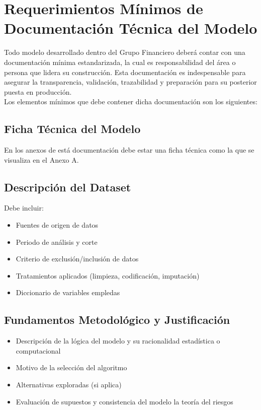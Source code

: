 \documentclass[11pt,oneside]{article}%
\begin{document}
\section{Requerimientos Mínimos de Documentación Técnica del Modelo}

Todo modelo desarrollado dentro del Grupo Financiero deberá contar con una documentación mínima estandarizada, la cual es responsabilidad del área o persona que lidera su construcción. Esta documentación es indespensable para asegurar la transparencia, validación, trazabilidad y preparación para su posterior puesta en producción. \\

Los elementos mínimos que debe contener dicha documentación son los siguientes: 

\subsection{Ficha Técnica del Modelo}

En los anexos de está documentación debe estar una ficha técnica como la que se visualiza en el Anexo A. 

\subsection{Descripción del Dataset}

Debe incluir: 
\begin{itemize}
\item Fuentes de origen de datos
\item Periodo de análisis y corte
\item Criterio de exclusión/inclusión de datos 
\item Tratamientos aplicados (limpieza, codificación, imputación)
\item Diccionario de variables empledas 
\end{itemize}

\subsection{Fundamentos Metodológico y Justificación} 
\begin{itemize}
\item Descripción de la lógica del modelo y su racionalidad estadística o computacional
\item Motivo de la selección del algoritmo
\item Alternativas exploradas (si aplica)
\item Evaluación de supuestos y consistencia del modelo la teoría del riesgos
\end{itemize}
\end{document}

